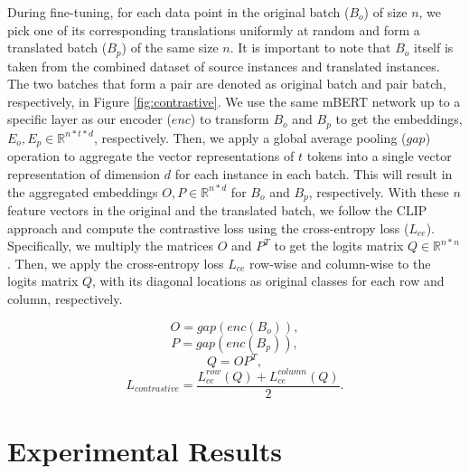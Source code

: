 \documentclass[11pt]{article}
\begin{document}
During fine-tuning, for each data point in the original batch ($B_{o}$) of size $n$, we pick one of its corresponding translations uniformly at random and form a translated batch ($B_{p}$) of the same size $n$. It is important to note that  $B_{o}$ itself is taken from the combined dataset of source instances and translated instances. The two batches that form a pair are denoted as original batch and pair batch, respectively, in Figure \ref{fig:contrastive}. We use the same mBERT network up to a specific layer as our encoder ($enc$) to transform $B_{o}$ and $B_{p}$ to get the embeddings, $E_{o}, E_{p} \in \mathbb{R}^{n*t*d} $, respectively. Then, we apply a global average pooling ($gap$) operation to aggregate the vector representations of $t$ tokens into a single vector representation of dimension $d$ for each instance in each batch. This will result in the aggregated embeddings $O, P \in \mathbb{R}^{n*d}$ for $B_{o}$ and $B_{p}$, respectively. With these $n$ feature vectors in the original and the translated batch, we follow the CLIP \cite{radford2021learning} approach and compute the contrastive loss using the cross-entropy loss ($L_{ce}$). Specifically, we multiply the matrices $O$ and $P^T$ to get the logits matrix $Q \in \mathbb{R}^{n*n}$. Then, we apply the cross-entropy loss $L_{ce}$ row-wise and column-wise to the logits matrix $Q$, with its diagonal locations as original classes for each row and column, respectively.

\begin{equation}
    O = gap(enc(B_{o})),
\end{equation}
\begin{equation}
    P = gap(enc(B_{p})),
\end{equation}
\begin{equation}
    Q = OP^T,
\end{equation}
\begin{equation}
    L_{contrastive} = \frac{L_{ce}^{row} (Q) + L_{ce}^{column} (Q)}{2}.
\end{equation}

\section{Experimental Results}
\end{document}
